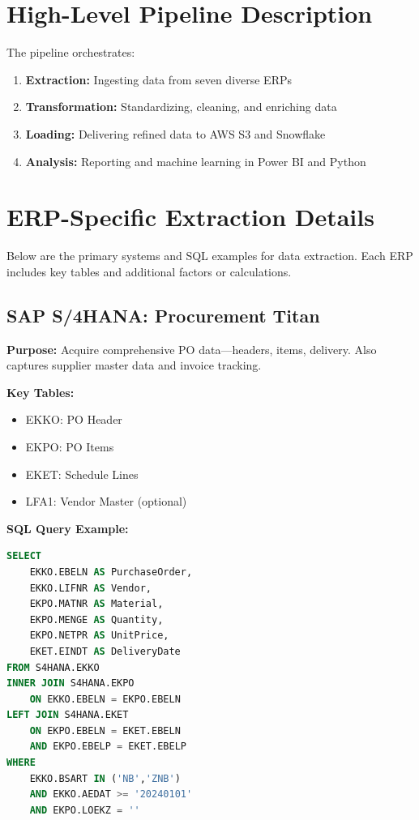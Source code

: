\documentclass[a4paper,10pt]{article}
\begin{document}
\section{High-Level Pipeline Description}
The pipeline orchestrates:
\begin{enumerate}[leftmargin=2em]
    \item \textbf{Extraction:} Ingesting data from seven diverse ERPs
    \item \textbf{Transformation:} Standardizing, cleaning, and enriching data
    \item \textbf{Loading:} Delivering refined data to AWS S3 and Snowflake
    \item \textbf{Analysis:} Reporting and machine learning in Power BI and Python
\end{enumerate}

\section{ERP-Specific Extraction Details}
Below are the primary systems and SQL examples for data extraction. Each ERP includes key tables and additional factors or calculations.

\subsection{SAP S/4HANA: Procurement Titan}
\textbf{Purpose:} Acquire comprehensive PO data—headers, items, delivery. Also captures supplier master data and invoice tracking.

\textbf{Key Tables:}
\begin{itemize}[leftmargin=2em]
    \item EKKO: PO Header
    \item EKPO: PO Items
    \item EKET: Schedule Lines
    \item LFA1: Vendor Master (optional)
\end{itemize}

\noindent
\textbf{SQL Query Example:}
\begin{lstlisting}[language=SQL]
SELECT 
    EKKO.EBELN AS PurchaseOrder,
    EKKO.LIFNR AS Vendor,
    EKPO.MATNR AS Material,
    EKPO.MENGE AS Quantity,
    EKPO.NETPR AS UnitPrice,
    EKET.EINDT AS DeliveryDate
FROM S4HANA.EKKO
INNER JOIN S4HANA.EKPO
    ON EKKO.EBELN = EKPO.EBELN
LEFT JOIN S4HANA.EKET
    ON EKPO.EBELN = EKET.EBELN
    AND EKPO.EBELP = EKET.EBELP
WHERE 
    EKKO.BSART IN ('NB','ZNB')
    AND EKKO.AEDAT >= '20240101'
    AND EKPO.LOEKZ = ''
\end{lstlisting}
\end{document}
